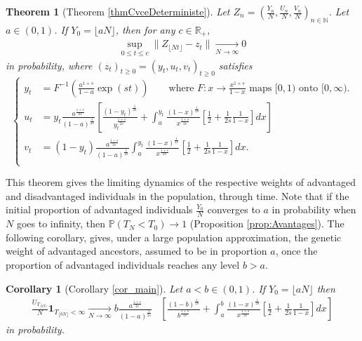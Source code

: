 \documentclass[11pt]{article}
\newtheorem*{theoremnonum}{Theorem}
\newtheorem*{cornonum}{Corollary}
\theoremstyle{remark}
\numberwithin{equation}{section}
\begin{document}
\begin{theoremnonum}[Theorem \ref{thmCvceDeterministe}] Let $Z_n=\left(\frac{Y_n}{N},\frac{U_n}{N},\frac{V_n}{N}\right)_{n\in\mathbb{N}}$. Let $a\in(0,1)$. If $Y_0=\lfloor aN\rfloor$, then for any $c\in\mathbb{R}_+$,
\begin{align}\sup_{0\leq t\leq c}\|Z_{\lfloor Nt\rfloor}-z_t\|\underset{N\rightarrow\infty}{\longrightarrow}0\end{align} 
in probability, where $(z_t)_{t\geq0}=(y_t,u_t,v_t)_{t\geq0}$ satisfies
$$\left\{\begin{aligned}
      y_t&= F^{-1}\left(\frac{a^{1+s}}{1-a}\exp(st)\right) \qquad\text{where  $F:x\rightarrow\frac{x^{1+s}}{1-x}$ maps $[0,1)$ onto $[0,\infty)$}.
      \\
      u_t&= y_t\frac{a^{\frac{1+s}{2s}}}{(1-a)^{\frac{1}{2s}}}\left[\frac{(1-y_t)^{\frac{1}{2s}}}{y_t^{\frac{1+s}{2s}}}+\int_a^{y_t}\frac{(1-x)^{\frac{1}{2s}}}{x^{\frac{1+s}{2s}}}\left[\frac{1}{2}+\frac{1}{2s}\frac{1}{1-x}\right]dx\right] \\
      v_t&= (1-y_t)\frac{a^{\frac{1+s}{2s}}}{(1-a)^{\frac{1}{2s}}}\int_a^{y_t}\frac{(1-x)^{\frac{1}{2s}}}{x^{\frac{1+s}{2s}}}\left[\frac{1}{2}+\frac{1}{2s}\frac{1}{1-x}\right]dx. \\
    \end{aligned}\right.$$
\end{theoremnonum}
This theorem gives the limiting dynamics of the respective weights of advantaged and disadvantaged individuals in the population, through time. Note that if the initial proportion of advantaged individuals $\frac{Y_0}{N}$ converges to $a$ in probability when $N$ goes to infinity, then $\mathbb{P}(T_N<T_0)\rightarrow 1$ (Proposition \ref{prop:Avantages}).
The following corollary, gives, under a large population approximation, the genetic weight of advantaged ancestors, assumed to be in proportion $a$, once the proportion of advantaged individuals reaches any level $b>a$. 
\begin{cornonum}[Corollary \ref{cor_main}] Let $a<b\in(0,1)$. If $Y_0=\lfloor aN\rfloor$ then 
\begin{align*}\frac{U_{T_{\lfloor bN\rfloor}}}{N}\mathbf{1}_{T_{\lfloor bN\rfloor}<\infty}\underset{N\rightarrow\infty}{\longrightarrow} b\frac{a^{\frac{1+s}{2s}}}{(1-a)^{\frac{1}{2s}}}&\left[\frac{(1-b)^{\frac{1}{2s}}}{b^{\frac{1+s}{2s}}}+\int_a^{b}\frac{(1-x)^{\frac{1}{2s}}}{x^{\frac{1+s}{2s}}}\left[\frac{1}{2}+\frac{1}{2s}\frac{1}{1-x}\right]dx\right] \end{align*} in probability.
\end{cornonum}
\end{document}
